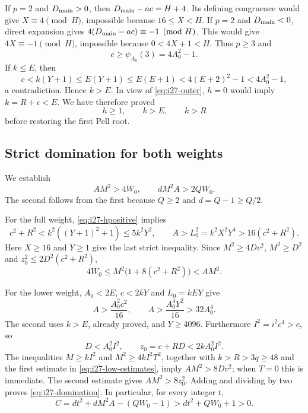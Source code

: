 If $p=2$ and $D_{\rm main}>0$, then
$D_{\rm main}-ac=H+4$. Its defining congruence would give
$X\equiv4\pmod H$, impossible because $16\le X<H$. If $p=2$ and
$D_{\rm main}<0$, direct expansion gives
$4(D_{\rm main}-ac)\equiv-1\pmod H$. This would give
$4X\equiv-1\pmod H$, impossible because $0<4X+1<H$.
Thus $p\ge3$ and
\[
 c\ge\psi_{A_0}(3)=4A_0^2-1.
\]
If $k\le E$, then
\[
 c<k(Y+1)\le E(Y+1)\le E(E+1)<4(E+2)^2-1<4A_0^2-1,
\]
a contradiction. Hence $k>E$. In view of \eqref{eq:i27-outer},
$h=0$ would imply $k=R+\epsilon<E$. We have therefore proved
\begin{equation}
 h\ge1,\qquad k>E,\qquad k>R
 \label{eq:i27-hpositive}
\end{equation}
before restoring the first Pell root.

\subsection{Strict domination for both weights}

We establish
\begin{equation}
 AM^2>4W_0,\qquad dM^2A>2QW_0.
 \label{eq:i27-domination}
\end{equation}
The second follows from the first because $Q\ge2$ and
$d=Q-1\ge Q/2$.

For the full weight, \eqref{eq:i27-hpositive} implies
\[
 c^2+R^2<k^2((Y+1)^2+1)\le5k^2Y^2,
 \qquad A>L_0^2=k^2X^2Y^4>16(c^2+R^2).
\]
Here $X\ge16$ and $Y\ge1$ give the last strict inequality. Since
$M^2\ge4Dv^2$, $M^2\ge D^2$ and
$z_0^2\le2D^2(c^2+R^2)$,
\[
 4W_0\le M^2\bigl(1+8(c^2+R^2)\bigr)<AM^2.
\]

For the lower weight, $A_0<2E$, $c<2kY$ and $L_0=kEY$ give
\begin{equation}
 A>\frac{A_0^2c^2}{16},\qquad
 A>\frac{A_0^4Y^2}{16}>32A_0^4.
 \label{eq:i27-low-estimates}
\end{equation}
The second uses $k>E$, already proved, and $Y\ge4096$.
Furthermore $I^2=i^2c^4>c$, so
\[
 D<A_0^2I^2,
 \qquad z_0=c+RD<2kA_0^2I^2.
\]
The inequalities $M\ge kI^2$ and $M^2\ge4kI^2T^2$, together with
$k>R>3q\ge48$ and the first estimate in
\eqref{eq:i27-low-estimates}, imply $AM^2>8Dv^2$; when $T=0$ this is
immediate. The second estimate gives $AM^2>8z_0^2$. Adding and dividing
by two proves \eqref{eq:i27-domination}. In particular, for every
integer $t$,
\begin{equation}
 C=d t^2+dM^2A-(QW_0-1)>d t^2+QW_0+1>0.
 \label{eq:i27-Cpositive}
\end{equation}

